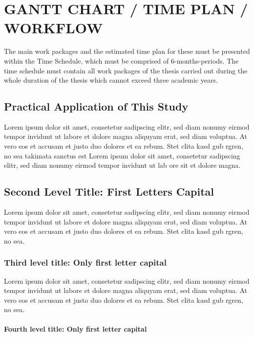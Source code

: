 \chapter{GANTT CHART / TIME PLAN / WORKFLOW}\label{Ch7}

The main work packages and the estimated time plan for these must be presented within the Time Schedule, which must be comprised of 6-months-periods. The time schedule must contain all work packages of the thesis carried out during the whole duration of the thesis which cannot exceed three academic years. 

\section{Practical Application of This Study}

Lorem ipsum dolor sit amet, consetetur sadipscing elitr, sed diam nonumy eirmod tempor invidunt ut labore et dolore magna aliquyam erat, sed diam voluptua. At vero eos et accusam et justo duo dolores et ea rebum. Stet clita kasd gub rgren, no sea takimata sanctus est Lorem ipsum dolor sit amet, consetetur sadipscing elitr, sed diam nonumy eirmod tempor invidunt ut lab ore sit et dolore magna.

\section{Second Level Title: First Letters Capital}

Lorem ipsum dolor sit amet, consetetur sadipscing elitr, sed diam nonumy eirmod tempor invidunt ut labore et dolore magna aliquyam erat, sed diam voluptua. At vero eos et accusam et justo duo dolores et ea rebum. Stet clita kasd gub rgren, no sea.

\subsection{Third level title: Only first letter capital}

Lorem ipsum dolor sit amet, consetetur sadipscing elitr, sed diam nonumy eirmod tempor invidunt ut labore et dolore magna aliquyam erat, sed diam voluptua. At vero eos et accusam et justo duo dolores et ea rebum. Stet clita kasd gub rgren, no sea.

\subsubsection{Fourth level title: Only first letter capital}

